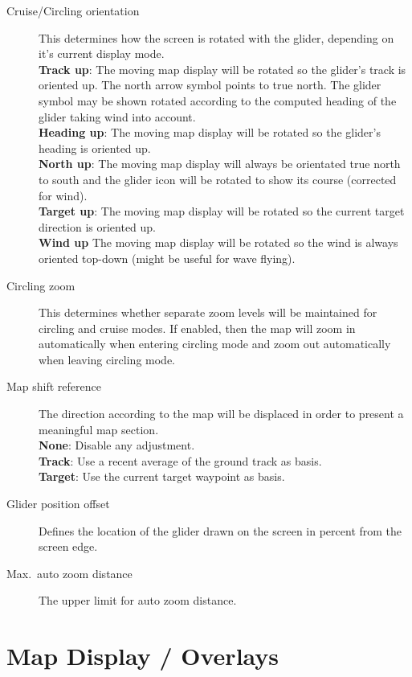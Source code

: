 \begin{description}
\item[Cruise/Circling orientation]  \label{conf:orientation} This determines how
  the screen is rotated with the glider, depending on it's current display mode. \\
  {\bf Track up}: The moving map display will be rotated so the glider's track
  is oriented up. The north arrow symbol points to true north. The glider symbol 
  may be shown rotated according to the computed heading of the glider taking 
  wind into account. \\
  {\bf Heading up}: The moving map display will be rotated so the glider's 
  heading is oriented up. \\
  {\bf North up}: The moving map display will always be orientated true north to
  south and the glider icon will be rotated to show its course (corrected for
  wind). \\
  {\bf Target up}: The moving map display will be rotated so the current target
  direction is oriented up. \\
  {\bf Wind up} The moving map display will be rotated so the wind is always 
  oriented top-down (might be useful for wave flying).
\item[Circling zoom]  \label{conf:circlingzoom} This determines whether separate
  zoom levels will be maintained for circling and cruise modes.  If enabled, then the 
  map will zoom in automatically when entering circling mode and zoom out
  automatically when leaving circling mode.
\item[Map shift reference]  The direction according to the map will be displaced 
  in order to present a meaningful map section. \\
  {\bf None}: Disable any adjustment. \\
  {\bf Track}: Use a recent average of the ground track as basis. \\
  {\bf Target}: Use the current target waypoint as basis.
\item[Glider position offset]  \label{conf:gliderposition} Defines the location of the 
  glider drawn on the screen in percent from the screen edge.
\item[Max.\ auto zoom distance]  The upper limit for auto zoom distance.
\end{description}


\section{Map Display / Overlays}

